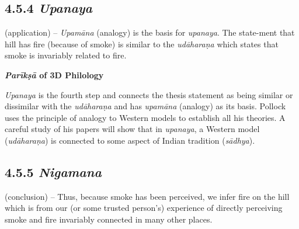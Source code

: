 \vspace{-.3cm}

\subsection*{4.5.4 {\it{\bfseries Upanaya}}}

\vspace{-.2cm}

(application) – \textit{Upamāna} (analogy) is the basis for \textit{upanaya}. The state-\break ment that hill has fire (because of smoke) is similar to the \textit{udāharaṇa} which states that smoke is invariably related to fire.

\textbf{\textit{Parīkṣā} of 3D Philology}

\textit{Upanaya} is the fourth step and connects the thesis statement as being similar or dissimilar with the \textit{udāharaṇa} and has \textit{upamāna} (analogy) as its basis. Pollock uses the principle of analogy to Western models to establish all his theories. A careful study of his papers will show that in \textit{upanaya}, a Western model (\textit{udāharaṇa}) is connected to some aspect of Indian tradition (\textit{sādhya}).

\vspace{-.3cm}

\subsection*{4.5.5 {\it {\bfseries Nigamana}}}

\vspace{-.2cm}

(conclusion) – Thus, because smoke has been perceived, we infer fire on the hill which is from our (or some trusted person’s) experience of directly perceiving smoke and fire invariably connected in many other places.

